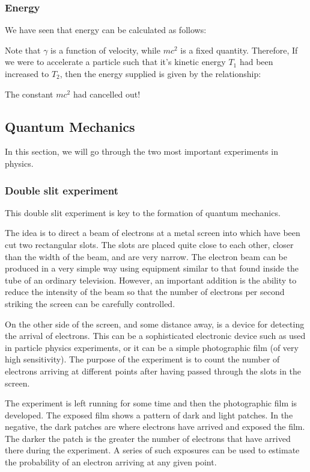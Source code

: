\subsubsection{Energy}
We have seen that energy can be calculated as follows:

Note that $\gamma$ is a function of velocity, while $mc^2$ is a fixed quantity. Therefore, If we were to accelerate a particle such that it's kinetic energy $T_1$ had been increased to $T_2$, then the energy supplied is given by the relationship:


The constant $mc^2$ had cancelled out!

\subsection{Quantum Mechanics}
In this section, we will go through the two most important experiments in physics.

\subsubsection{Double slit experiment}
This double slit experiment is key to the formation of quantum mechanics.

The idea is to direct a beam of electrons at a metal screen into which have been cut two rectangular slots. The slots are placed quite close to each other, closer than the width of the beam, and are very narrow. The electron beam can be produced in a very simple way using equipment similar to that found inside the tube of an ordinary television. However, an important addition is the ability to reduce the intensity of the beam so that the number of electrons per second striking the screen can be carefully controlled.

On the other side of the screen, and some distance away, is a device for detecting the arrival of electrons. This can be a sophisticated electronic device such as used in particle physics experiments, or it can be a simple photographic film (of very high sensitivity). The purpose of the experiment is to count the number of electrons arriving at different points after having passed through the slots in the screen.

The experiment is left running for some time and then the photographic film is developed. The exposed film shows a pattern of dark and light patches. In the negative, the dark patches are where electrons have arrived and exposed the film. The darker the patch is the greater the number of electrons that have arrived there during the experiment. A series of such exposures can be used to estimate the probability of an electron arriving at any given point.

